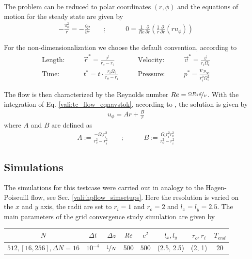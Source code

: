 The problem can be reduced to polar coordinates $(r, \phi)$ and the equations of motion for the steady state are given by \citep{Kundu2012}
\begin{align}
    \label{vali:tc_flow_eqnavstok}
    -\frac{u^2_\phi}{r} = - \frac{\partial p}{\partial r} \qquad ;& \qquad 0 = \frac{1}{Re}\frac{\partial}{\partial r}\left(\frac{1}{r}\frac{\partial}{\partial r}(r u_\phi)\right)
\end{align}

\clearpage

For the non-dimensionalization we choose the default convention, according to  \citep{Chen2015}
\begin{align}
    \text{Length:}\qquad &  \vec{r}^* = \frac{\vec{r}}{r_o - r_i}  &
    \qquad \text{Velocity:}\qquad& \vec{v}^* =  \frac{\vec{v}}{r_i\Omega_i}\\
    \text{Time:}  \qquad & t^* = t \cdot \frac{r_i \Omega_i}{r_o - r_i}&
    \qquad  \text{Pressure:}\qquad & p^* = \frac{\nabla p_\infty}{r_i^2\Omega_i^2}
\end{align}


The flow is then characterized by the Reynolds number $Re = \nicefrac{\Omega R_1d}{\nu}$.
With the integration of Eq. \ref{vali:tc_flow_eqnavstok}, according to \citep{Kundu2012}, the solution is given by
\begin{align}
    u_\phi = Ar + \frac{B}{r}
\end{align}
where $A$ and $B$ are defined as
\begin{align}
    A := \frac{-\Omega_i r_i^2}{r^2_o - r^2_i} \qquad ;& \qquad B := \frac{\Omega_i r^2_i r^2_o}{r^2_o - r^2_i}
\end{align}

\subsection{Simulations}


The simulations for this testcase were carried out in analogy to the Hagen-Poiseuill flow, see Sec. \ref{vali:hpflow_simsetups}.
Here the resolution is varied on the $x$ and $y$ axis, the radii are set to $r_i=1$ and $r_o=2$ and $l_x=l_y=2.5$.
The main parameters of the grid convergence study simulation are  given by

\begin{center}
\vspace*{0.7ex}
\begin{tabular}{c|c|c|c|c|c|c|c }
 $ N  $                   & $\Delta t$ & $\Delta z$            & $\mbox{\textit{Re}}$  & $c^2$   & $l_x, l_y$ & $r_o, r_i$ & $T_{end}$\\
\hline
 $512, [16, 256], \Delta N = 16 $& $10^{-4}$ & $\nicefrac{1}{N}$ & 500     & $500$   & (2.5, 2.5) & (2, 1)     & 20\\
\end{tabular}
\vspace*{0.7ex}
\end{center}

